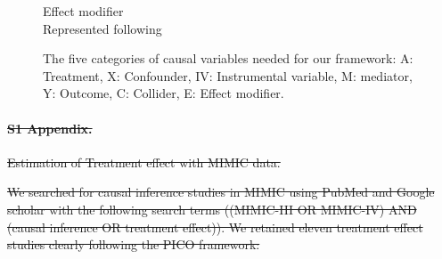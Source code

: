\documentclass[10pt,letterpaper]{article}
\providecommand{\DIFdeltex}[1]{{\protect\color{red}\sout{#1}}}                      %
\providecommand{\DIFdelbegin}{} %
\providecommand{\DIFdelend}{} %
\providecommand{\DIFdel}[1]{\texorpdfstring{\DIFdeltex{#1}}{}} %
\newcommand{\DIFscaledelfig}{0.5}
\newlength{\DIFdelgraphicswidth} %
\newlength{\DIFdelgraphicsheight} %
\newcommand{\DIFdelincludegraphics}[2][]{%
\sbox{\DIFdelgraphicsbox}{\DIFOincludegraphics[#1]{#2}}%
\settoboxwidth{\DIFdelgraphicswidth}{\DIFdelgraphicsbox} %
\settoboxtotalheight{\DIFdelgraphicsheight}{\DIFdelgraphicsbox} %
\scalebox{\DIFscaledelfig}{%
\parbox[b]{\DIFdelgraphicswidth}{\usebox{\DIFdelgraphicsbox}\\[-\baselineskip] \rule{\DIFdelgraphicswidth}{0em}}\llap{\resizebox{\DIFdelgraphicswidth}{\DIFdelgraphicsheight}{%
\setlength{\unitlength}{\DIFdelgraphicswidth}%
\begin{picture}(1,1)%
\thicklines\linethickness{2pt} %
{\color[rgb]{1,0,0}\put(0,0){\framebox(1,1){}}}%
{\color[rgb]{1,0,0}\put(0,0){\line( 1,1){1}}}%
{\color[rgb]{1,0,0}\put(0,1){\line(1,-1){1}}}%
\end{picture}%
}\hspace*{3pt}}} %
} %
\DeclareRobustCommand{\DIFdelbegin}{\DIFOdelbegin \let\includegraphics\DIFdelincludegraphics} %
\DeclareRobustCommand{\DIFdelend}{\DIFOaddend \let\includegraphics\DIFOincludegraphics} %
\begin{document}
\begin{figure}[h!]
\begin{minipage}[t]{0.4\linewidth}
    \small\sffamily Effect modifier \scriptsize\\Represented
    following \cite{attia2022proposal}
  \end{minipage}
  \caption{The five categories of causal variables needed for our framework: A:
    Treatment, X: Confounder, IV: Instrumental variable, M: mediator, Y:
    Outcome, C: Collider, E: Effect modifier.}\label{fig:causal_variables}
\end{figure}
\clearpage



\DIFdelbegin \paragraph*{\DIFdel{S1 Appendix.}}
\DIFdel{Estimation of Treatment effect with MIMIC data.}%
\DIFdelend %

\DIFdelbegin \DIFdel{We searched for causal inference studies in MIMIC using PubMed and Google
  scholar with the following search terms ((MIMIC-III OR MIMIC-IV) AND (causal
  inference OR treatment effect)). We retained eleven treatment effect studies
  clearly following the PICO framework:
}\DIFdelend %
\end{document}
